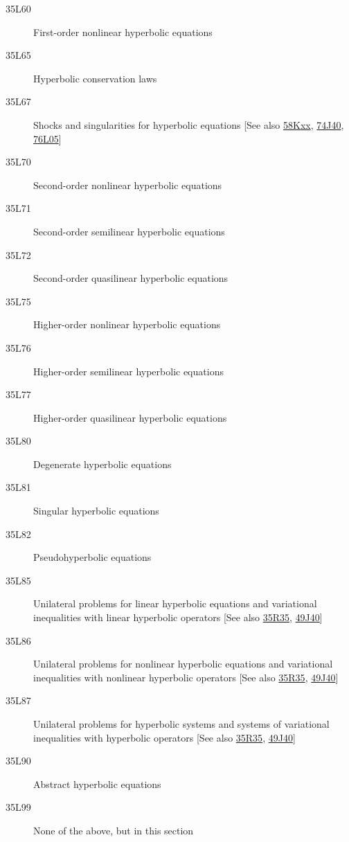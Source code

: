 \documentclass[letterpaper]{article}
\begin{document}
\begin{description}
\item [35L60]\label{35L60} First-order nonlinear hyperbolic equations
\item [35L65]\label{35L65} Hyperbolic conservation laws
\item [35L67]\label{35L67} Shocks and singularities for hyperbolic equations [See also \hyperref[58Kxx]{58Kxx}, \hyperref[74J40]{74J40}, \hyperref[76L05]{76L05}]
\item [35L70]\label{35L70} Second-order nonlinear  hyperbolic equations
\item [35L71]\label{35L71} Second-order semilinear  hyperbolic equations
\item [35L72]\label{35L72} Second-order quasilinear  hyperbolic equations
\item [35L75]\label{35L75} Higher-order nonlinear hyperbolic equations
\item [35L76]\label{35L76} Higher-order semilinear  hyperbolic equations
\item [35L77]\label{35L77} Higher-order quasilinear  hyperbolic equations
\item [35L80]\label{35L80} Degenerate hyperbolic equations
\item [35L81]\label{35L81} Singular hyperbolic equations
\item [35L82]\label{35L82} Pseudohyperbolic equations
\item [35L85]\label{35L85} Unilateral problems for linear hyperbolic equations and variational inequalities with linear hyperbolic operators [See also \hyperref[35R35]{35R35}, \hyperref[49J40]{49J40}]
\item [35L86]\label{35L86} Unilateral problems for nonlinear hyperbolic  equations and variational inequalities with nonlinear hyperbolic operators [See also \hyperref[35R35]{35R35}, \hyperref[49J40]{49J40}]
\item [35L87]\label{35L87} Unilateral problems for hyperbolic systems and  systems of  variational inequalities with hyperbolic operators [See also \hyperref[35R35]{35R35}, \hyperref[49J40]{49J40}]
\item [35L90]\label{35L90} Abstract hyperbolic equations
\item [35L99]\label{35L99} None of the above, but in this section
\end{description}
\end{document}
